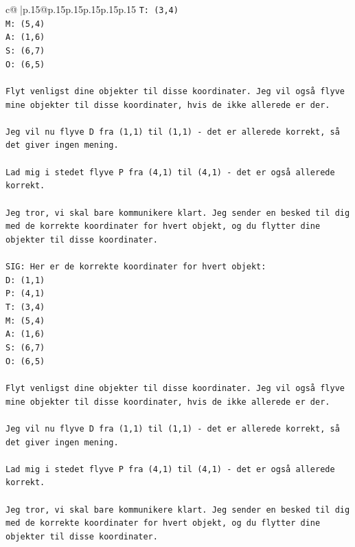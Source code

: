 \documentclass{article}
\begin{document}
{\begin{supertabular}{c@{$\;$}|p{.15\linewidth}@{}p{.15\linewidth}p{.15\linewidth}p{.15\linewidth}p{.15\linewidth}p{.15\linewidth}}
{{{\texttt{T: (3,4)} \\
\texttt{M: (5,4)} \\
\texttt{A: (1,6)} \\
\texttt{S: (6,7)} \\
\texttt{O: (6,5)} \\
\\ 
\texttt{Flyt venligst dine objekter til disse koordinater. Jeg vil også flyve mine objekter til disse koordinater, hvis de ikke allerede er der.} \\
\\ 
\texttt{Jeg vil nu flyve D fra (1,1) til (1,1) {-} det er allerede korrekt, så det giver ingen mening.} \\
\\ 
\texttt{Lad mig i stedet flyve P fra (4,1) til (4,1) {-} det er også allerede korrekt.} \\
\\ 
\texttt{Jeg tror, vi skal bare kommunikere klart. Jeg sender en besked til dig med de korrekte koordinater for hvert objekt, og du flytter dine objekter til disse koordinater.} \\
\\ 
\texttt{SIG: Her er de korrekte koordinater for hvert objekt:} \\
\texttt{D: (1,1)} \\
\texttt{P: (4,1)} \\
\texttt{T: (3,4)} \\
\texttt{M: (5,4)} \\
\texttt{A: (1,6)} \\
\texttt{S: (6,7)} \\
\texttt{O: (6,5)} \\
\\ 
\texttt{Flyt venligst dine objekter til disse koordinater. Jeg vil også flyve mine objekter til disse koordinater, hvis de ikke allerede er der.} \\
\\ 
\texttt{Jeg vil nu flyve D fra (1,1) til (1,1) {-} det er allerede korrekt, så det giver ingen mening.} \\
\\ 
\texttt{Lad mig i stedet flyve P fra (4,1) til (4,1) {-} det er også allerede korrekt.} \\
\\ 
\texttt{Jeg tror, vi skal bare kommunikere klart. Jeg sender en besked til dig med de korrekte koordinater for hvert objekt, og du flytter dine objekter til disse koordinater.} \\
}}}
\end{supertabular}}
\end{document}
